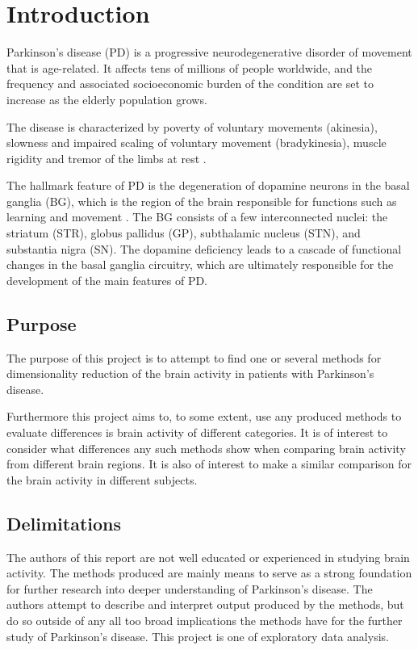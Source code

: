 \documentclass{kththesis}
\begin{document}
\tableofcontents

\mainmatter

\chapter{Introduction}

Parkinson's disease (PD) is a progressive neurodegenerative disorder of movement that is age-related. 
It affects tens of millions of people worldwide, and the frequency and associated socioeconomic burden of the condition are set to increase as the elderly population grows.

The disease is characterized by poverty of voluntary movements (akinesia), slowness and impaired scaling of voluntary movement (bradykinesia), muscle rigidity and tremor of the limbs at rest \parencite{DeMaags}.

The hallmark feature of PD is the degeneration of dopamine neurons in the basal ganglia (BG), which is the region of the brain responsible for functions such as learning and movement \parencite{Hammond}. 
The BG consists of a few interconnected nuclei: the striatum (STR), globus pallidus (GP), subthalamic nucleus (STN), and substantia nigra (SN). 
The dopamine deficiency leads to a cascade of functional changes in the basal ganglia circuitry, which are ultimately responsible for the development of the main features of PD.

\section{Purpose}

The purpose of this project is to attempt to find one or several methods for dimensionality reduction of the brain activity in patients with Parkinson's disease.

Furthermore this project aims to, to some extent, use any produced methods to evaluate differences is brain activity of different categories.
It is of interest to consider what differences any such methods show when comparing brain activity from different brain regions.
It is also of interest to make a similar comparison for the brain activity in different subjects.

\section{Delimitations}

The authors of this report are not well educated or experienced in studying brain activity.
The methods produced are mainly means to serve as a strong foundation for further research into deeper understanding of Parkinson's disease.
The authors attempt to describe and interpret output produced by the methods, but do so outside of any all too broad implications the methods have for the further study of Parkinson's disease.
This project is one of exploratory data analysis.
\end{document}
